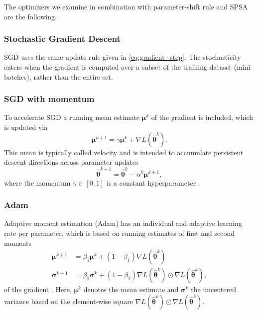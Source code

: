 The optimizers we examine in combination with parameter-shift rule and SPSA are the following.
\subsubsection{Stochastic Gradient Descent}
\gls{SGD} uses the same update rule given in \cref{eq:gradient_step}. The stochasticity enters when the gradient is computed over a subset of the training dataset (mini-batches), rather than the entire set. %

\subsubsection{SGD with momentum}
To accelerate SGD a running mean estimate $\bm{\mu}^k$ of the gradient is included, which is updated via
\begin{equation*}
    \bm{\mu}^{k+1} = \gamma \bm{\mu}^k + \nabla L(\hat{\bm{\theta}}^k).
\end{equation*}
This mean is typically called velocity and is intended to accumulate persistent descent directions across parameter updates
\begin{equation}
    \hat{\bm{\theta}}^{k+1} = \hat{\bm{\theta}}^k - \alpha^k \bm{\mu}^{k+1},
\end{equation}
where the momentum $\gamma \in [0, 1]$ is a constant hyperparameter \cite{sutskever2013importance}.

\subsubsection{Adam}
Adaptive moment estimation (Adam) has an individual and adaptive learning rate per parameter, which is based on running estimates of first and second moments
\begin{align*}
    \bm{\mu}^{k+1} &= \beta_1 \bm{\mu}^k + (1 -\beta_1) \nabla L(\hat{\bm{\theta}}^k) \\
    \bm{\sigma}^{k+1} &= \beta_2 \bm{\sigma}^k + (1 -\beta_2) \nabla L(\hat{\bm{\theta}}^k) \odot \nabla L(\hat{\bm{\theta}}^k),
\end{align*}
of the gradient \cite{ADAM}. Here, $\bm{\mu}^k$ denotes the mean estimate and $\bm{\sigma}^k$ the uncentered variance based on the element-wise square $\nabla L(\hat{\bm{\theta}}^k) \odot \nabla L(\hat{\bm{\theta}}^k)$.

